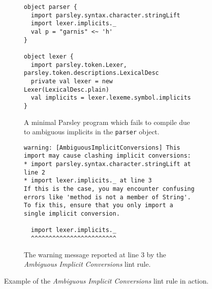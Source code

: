 \documentclass[../../main.tex]{subfiles}
\begin{document}
\begin{figure}[htbp]
\begin{subfigure}{\textwidth}
\begin{verbatim}
object parser {
  import parsley.syntax.character.stringLift
  import lexer.implicits._
  val p = "garnis" <~ 'h'
}

object lexer {
  import parsley.token.Lexer, parsley.token.descriptions.LexicalDesc
  private val lexer = new Lexer(LexicalDesc.plain)
  val implicits = lexer.lexeme.symbol.implicits
}
\end{verbatim}
\caption{A minimal Parsley program which fails to compile due to ambiguous implicits in the \texttt{parser} object.}
\label{fig:ambiguous-implicits-example}
\end{subfigure}
%
\begin{subfigure}{\textwidth}
\vspace{3ex} %
\begin{verbatim}
warning: [AmbiguousImplicitConversions] This import may cause clashing implicit conversions:
* import parsley.syntax.character.stringLift at line 2
* import lexer.implicits._ at line 3
If this is the case, you may encounter confusing errors like 'method is not a member of String'.
To fix this, ensure that you only import a single implicit conversion.

  import lexer.implicits._
  ^^^^^^^^^^^^^^^^^^^^^^^^  
\end{verbatim}
\caption{The warning message reported at line 3 by the \emph{Ambiguous Implicit Conversions} lint rule.}
\label{fig:ambiguous-implicits-warning}
\end{subfigure}
\caption{Example of the \emph{Ambiguous Implicit Conversions} lint rule in action.}
\end{figure}
\end{document}
